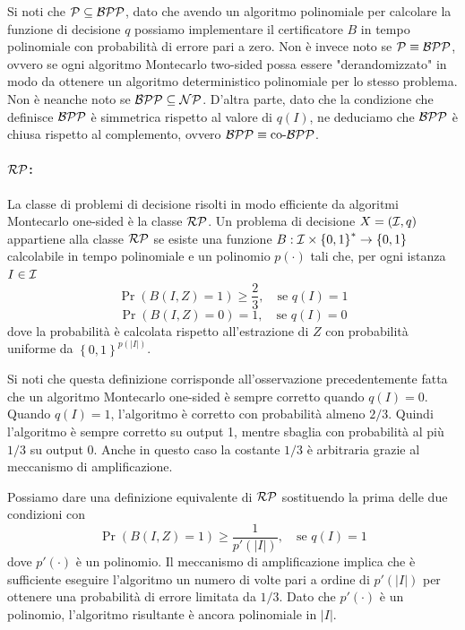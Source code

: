 Si noti che $\mathcal{P} \subseteq \mathcal{BPP}$, dato che avendo un algoritmo polinomiale per calcolare la funzione di decisione $q$ possiamo implementare il certificatore $B$ in tempo polinomiale con probabilità di errore pari a zero. Non è invece noto se $\mathcal{P} \equiv \mathcal{BPP}$, ovvero se ogni algoritmo Montecarlo two-sided possa essere "derandomizzato" in modo da ottenere un algoritmo deterministico polinomiale per lo stesso problema. Non è neanche noto se $\mathcal{BPP} \subseteq \mathcal{NP}$. D'altra parte, dato che la condizione che definisce $\mathcal{BPP}$ è simmetrica rispetto al valore di $q(I)$, ne deduciamo che $\mathcal{BPP}$ è chiusa rispetto al complemento, ovvero $\mathcal{BPP} \equiv \text{co-}\mathcal{BPP}$.

\paragraph{$\mathcal{RP}$:} La classe di problemi di decisione risolti in modo efficiente da algoritmi Montecarlo one-sided è la classe $\mathcal{RP}$. Un problema di decisione $X = (\mathcal{I}, q)$ appartiene alla classe $\mathcal{RP}$ se esiste una funzione $B: \mathcal{I} \times \left\{0,1\right\}^\ast \rightarrow \left\{0,1\right\}$ calcolabile in tempo polinomiale e un polinomio $p(\cdot)$ tali che, per ogni istanza $I \in \mathcal{I}$
$$
\Pr \left(B(I,Z) = 1\right) \geq \frac{2}{3}, \quad \text{se } q(I) = 1
$$
$$
\Pr \left(B(I,Z) = 0\right) = 1, \quad \text{se } q(I) = 0
$$
dove la probabilità è calcolata rispetto all'estrazione di $Z$ con probabilità uniforme da $\left\{0,1\right\}^{p(|I|)}$.

Si noti che questa definizione corrisponde all'osservazione precedentemente fatta che un algoritmo Montecarlo one-sided è sempre corretto quando $q(I) = 0$. Quando $q(I) = 1$, l'algoritmo è corretto con probabilità almeno $2/3$. Quindi l'algoritmo è sempre corretto su output 1, mentre sbaglia con probabilità al più $1/3$ su output 0. Anche in questo caso la costante $1/3$ è arbitraria grazie al meccanismo di amplificazione.

Possiamo dare una definizione equivalente di $\mathcal{RP}$ sostituendo la prima delle due condizioni con
$$
\Pr \left(B(I,Z) = 1\right) \geq \frac{1}{p'(|I|)}, \quad \text{se } q(I) = 1
$$
dove $p'(\cdot)$ è un polinomio. Il meccanismo di amplificazione implica che è sufficiente eseguire l'algoritmo un numero di volte pari a ordine di $p'(|I|)$ per ottenere una probabilità di errore limitata da $1/3$. Dato che $p'(\cdot)$ è un polinomio, l'algoritmo risultante è ancora polinomiale in $|I|$.

